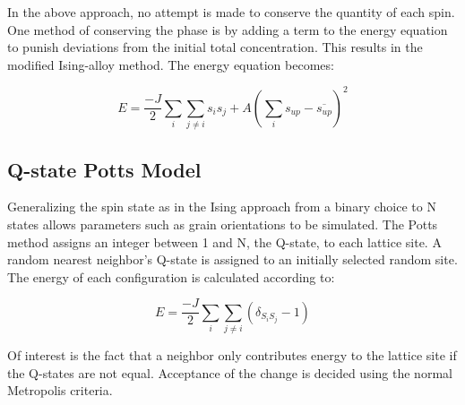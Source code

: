 \documentclass{report}
\begin{document}
    In the above approach, no attempt is made to conserve the quantity of each spin.  One method of conserving the phase is by adding a term to the energy equation to punish deviations from the initial total concentration.  This results in the modified Ising-alloy method.  The energy equation becomes:

    \begin{equation} \label{ising-alloy_energy}
        E = \frac{-J}{2} \sum_{i} \sum_{j\ne i} s_i s_j + A(\sum_{i} s_{up} - \overline{s_{up}} )^2
    \end{equation}

    \subsection{Q-state Potts Model}
    Generalizing the spin state as in the Ising approach from a binary choice to N states allows parameters such as grain orientations to be simulated.  The Potts method assigns an integer between 1 and N, the Q-state, to each lattice site.  A random nearest neighbor's Q-state is assigned to an initially selected random site.  The energy of each configuration is calculated according to:

    \begin{equation} \label{potts_energy}
        E = \frac{-J}{2} \sum_{i} \sum_{j \ne i} (\delta_{S_i S_j} - 1)
    \end{equation}

    Of interest is the fact that a neighbor only contributes energy to the lattice site if the Q-states are not equal.  Acceptance of the change is decided using the normal Metropolis criteria.
\end{document}
